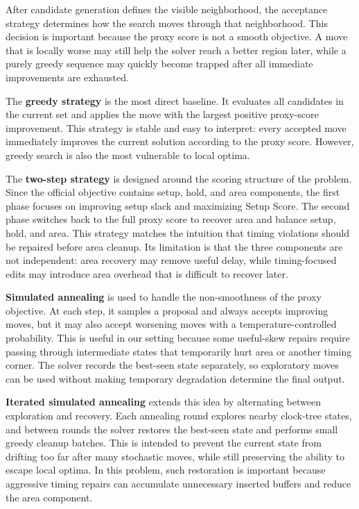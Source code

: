 \documentclass{article}
\begin{document}
After candidate generation defines the visible neighborhood, the acceptance strategy determines how the search moves through that neighborhood. This decision is important because the proxy score is not a smooth objective. A move that is locally worse may still help the solver reach a better region later, while a purely greedy sequence may quickly become trapped after all immediate improvements are exhausted.

The \textbf{greedy strategy} is the most direct baseline. It evaluates all candidates in the current set and applies the move with the largest positive proxy-score improvement. This strategy is stable and easy to interpret: every accepted move immediately improves the current solution according to the proxy score. However, greedy search is also the most vulnerable to local optima.

The \textbf{two-step strategy} is designed around the scoring structure of the problem. Since the official objective contains setup, hold, and area components, the first phase focuses on improving setup slack and maximizing Setup Score. The second phase switches back to the full proxy score to recover area and balance setup, hold, and area. This strategy matches the intuition that timing violations should be repaired before area cleanup. Its limitation is that the three components are not independent: area recovery may remove useful delay, while timing-focused edits may introduce area overhead that is difficult to recover later.

\textbf{Simulated annealing}\cite{kirkpatrick1983optimization} is used to handle the non-smoothness of the proxy objective. At each step, it samples a proposal and always accepts improving moves, but it may also accept worsening moves with a temperature-controlled probability. This is useful in our setting because some useful-skew repairs require passing through intermediate states that temporarily hurt area or another timing corner. The solver records the best-seen state separately, so exploratory moves can be used without making temporary degradation determine the final output.

\textbf{Iterated simulated annealing} extends this idea by alternating between exploration and recovery. Each annealing round explores nearby clock-tree states, and between rounds the solver restores the best-seen state and performs small greedy cleanup batches. This is intended to prevent the current state from drifting too far after many stochastic moves, while still preserving the ability to escape local optima. In this problem, such restoration is important because aggressive timing repairs can accumulate unnecessary inserted buffers and reduce the area component.
\end{document}
